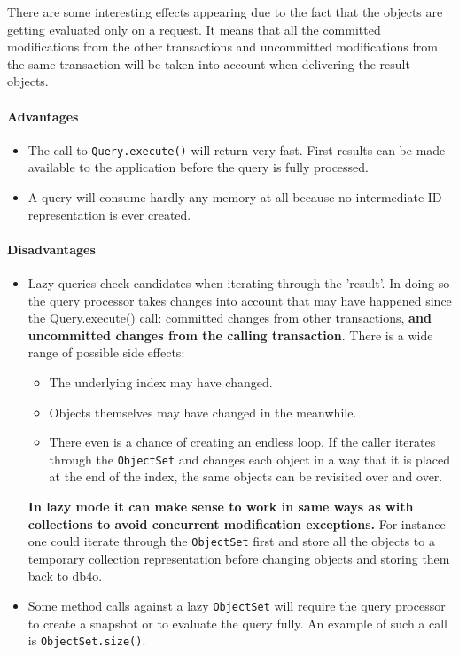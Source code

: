 There are some interesting effects appearing due to the fact that the objects are getting evaluated only on a request. It means that all the committed modifications from the other transactions and uncommitted modifications from the same transaction will be taken into account when delivering the result objects.

\paragraph*{Advantages}

\begin{itemize}
\item The call to \texttt{Query.execute()} will return very fast. First results can be made available to the application before the query is fully processed.
\item A query will consume hardly any memory at all because no intermediate ID representation is ever created.
\end{itemize}

\paragraph*{Disadvantages}

\begin{itemize}
\item Lazy queries check candidates when iterating through the 'result'. In doing so the query processor takes changes into account that may have happened since the Query.execute() call: committed changes from other transactions, \textbf{and uncommitted changes from the calling transaction}. There is a wide range of possible side effects:

\begin{itemize}
\item The underlying index may have changed.
\item Objects themselves may have changed in the meanwhile.
\item There even is a chance of creating an endless loop. If the caller iterates through the \texttt{ObjectSet} and changes each object in a way that it is placed at the end of the index, the same objects can be revisited over and over.
\end{itemize} \textbf{In lazy mode it can make sense to work in same ways as with collections to avoid concurrent modification exceptions.} For instance one could iterate through the \texttt{ObjectSet} first and store all the objects to a temporary collection representation before changing objects and storing them back to db4o.
\item Some method calls against a lazy \texttt{ObjectSet} will require the query processor to create a snapshot or to evaluate the query fully. An example of such a call is \texttt{ObjectSet.size()}.
\end{itemize}

